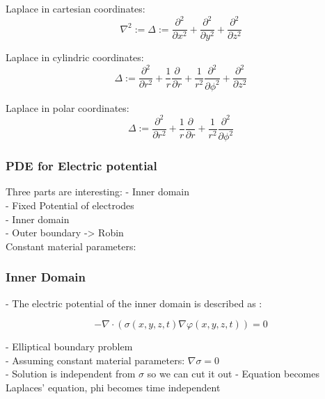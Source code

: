 \documentclass[parskip=half, titlepage=yes, 12pt, BCOR=12mm, DIV=calc]{scrartcl}
\begin{document}
Laplace in cartesian coordinates:
\begin{equation}
    \nabla^2 := \Delta := \frac{\partial^2}{\partial x^2} + \frac{\partial^2}{\partial y^2} + \frac{\partial^2}{\partial z^2}
\end{equation}

Laplace in cylindric coordinates:
\begin{equation}
    \Delta := \frac{\partial^2}{\partial r^2} + \frac{1}{r} \frac{\partial}{\partial r} + \frac{1}{r^2} \frac{\partial^2}{\partial \phi^2} + \frac{\partial^2}{\partial z^2}
\end{equation}

Laplace in polar coordinates:
\begin{equation}
    \Delta := \frac{\partial^2}{\partial r^2} + \frac{1}{r} \frac{\partial}{\partial r} + \frac{1}{r^2} \frac{\partial^2}{\partial \phi^2}
\end{equation}



\subsubsection{PDE for Electric potential}

Three parts are interesting:
- Inner domain \\
- Fixed Potential of electrodes \\
- Inner domain \\
- Outer boundary -> Robin \\

Constant material parameters: \\

\subsubsection{Inner Domain}

- The electric potential of the inner domain is described as : 

\begin{equation}
    - \nabla \cdot (\sigma(x,y,z,t) \nabla \varphi(x,y,z,t)) = 0
\end{equation}

- Elliptical boundary problem \\
- Assuming constant material parameters: $\nabla \sigma = 0$ \\
- Solution is independent from $\sigma$ so we can cut it out
- Equation becomes Laplaces' equation, phi becomes time independent \\
\end{document}
